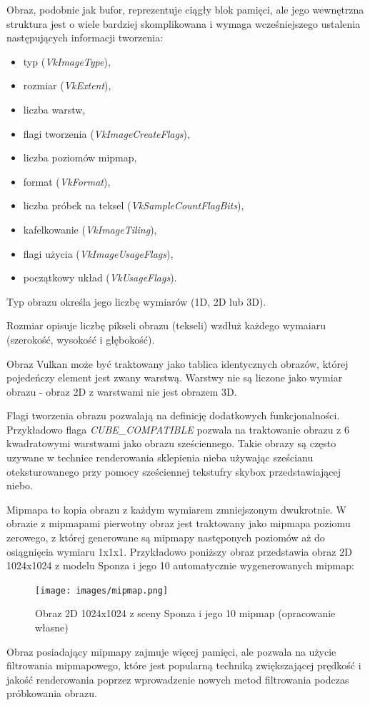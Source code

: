 Obraz, podobnie jak bufor, reprezentuje ciągły blok pamięci, ale jego wewnętrzna struktura jest o wiele bardziej skomplikowana i wymaga wcześniejszego ustalenia następujących informacji tworzenia:
\begin{itemize}
	\item typ (\textit{VkImageType}),
	\item rozmiar (\textit{VkExtent}),
	\item liczba warstw,
	\item flagi tworzenia (\textit{VkImageCreateFlags}),
	\item liczba poziomów mipmap,
	\item format (\textit{VkFormat}),
	\item liczba próbek na teksel (\textit{VkSampleCountFlagBits}),
	\item kafelkowanie (\textit{VkImageTiling}),
	\item flagi użycia (\textit{VkImageUsageFlags}),
	\item początkowy układ (\textit{VkUsageFlags}).
\end{itemize}

Typ obrazu określa jego liczbę wymiarów (1D, 2D lub 3D).

Rozmiar opisuje liczbę pikseli obrazu (tekseli) wzdłuż każdego wymaiaru (szerokość, wysokość i głębokość).

Obraz Vulkan może być traktowany jako tablica identycznych obrazów, której pojedeńczy element jest zwany warstwą. Warstwy nie są liczone jako wymiar obrazu - obraz 2D z warstwami nie jest obrazem 3D.

Flagi tworzenia obrazu pozwalają na definicję dodatkowych funkcjonalności. Przykładowo flaga \textit{CUBE\_COMPATIBLE} pozwala na traktowanie obrazu z 6 kwadratowymi warstwami jako obrazu sześciennego.
Takie obrazy są często uzywane w technice renderowania sklepienia nieba używając sześcianu oteksturowanego przy pomocy sześciennej tekstufry skybox przedstawiającej niebo.

Mipmapa to kopia obrazu z każdym wymiarem zmniejszonym dwukrotnie.
W obrazie z mipmapami pierwotny obraz jest traktowany jako mipmapa poziomu zerowego, z której generowane są mipmapy następonych poziomów aż do osiągnięcia wymiaru 1x1x1.
Przykładowo poniższy obraz przedstawia obraz 2D 1024x1024 z modelu Sponza \cite{GLTFSAMPLEMODELS} i jego 10 automatycznie wygenerowanych mipmap:
\begin{figure}[htbp]
	\centering
	\texttt{[image: images/mipmap.png]}
	\caption{Obraz 2D 1024x1024 z sceny Sponza \cite{GLTFSAMPLEMODELS} i jego 10 mipmap (opracowanie własne)}
	\label{mipmap}
\end{figure}
Obraz posiadający mipmapy zajmuje więcej pamięci, ale pozwala na użycie filtrowania mipmapowego, które jest popularną techniką zwiększającej prędkość i jakość renderowania poprzez wprowadzenie nowych metod filtrowania podczas próbkowania obrazu.


